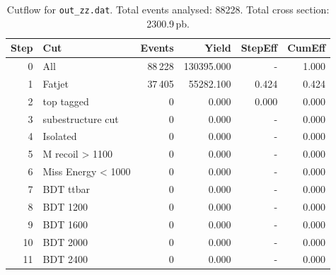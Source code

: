 \documentclass{article}
\begin{document}
\begin{table}[ht]
\centering
\begin{tabular}{r l r r r r}
\toprule
Step & Cut & Events & Yield & StepEff & CumEff \\
\midrule
0 & All & 88\,228 & 130395.000 & - & 1.000 \\
1 & Fatjet & 37\,405 & 55282.100 & 0.424 & 0.424 \\
2 & top tagged & 0 & 0.000 & 0.000 & 0.000 \\
3 & subestructure cut & 0 & 0.000 & - & 0.000 \\
4 & Isolated & 0 & 0.000 & - & 0.000 \\
5 & M recoil > 1100 & 0 & 0.000 & - & 0.000 \\
6 & Miss Energy < 1000 & 0 & 0.000 & - & 0.000 \\
7 & BDT ttbar & 0 & 0.000 & - & 0.000 \\
8 & BDT 1200 & 0 & 0.000 & - & 0.000 \\
9 & BDT 1600 & 0 & 0.000 & - & 0.000 \\
10 & BDT 2000 & 0 & 0.000 & - & 0.000 \\
11 & BDT 2400 & 0 & 0.000 & - & 0.000 \\
\bottomrule
\end{tabular}
\caption{Cutflow for \texttt{out\_zz.dat}. Total events analysed: 88228. Total cross section: 2300.9\,pb.}
\label{tab:cutflow-out-zz-dat}
\end{table}
\end{document}
